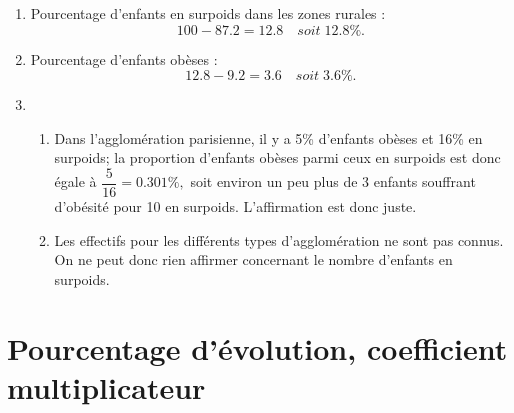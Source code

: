 \documentclass[xcolor={dvipsnames}]{beamer}
\begin{document}
\begin{frame}{}
\begin{enumerate}
	\item  Pourcentage d'enfants en surpoids dans les zones rurales :\pause
	\begin{equation*}
	\num{100} - \num{87.2} = \num{12.8} \quad soit \; \num{12.8} \%.
	\end{equation*}\pause
	
	 
	
	\item  Pourcentage d'enfants obèses :\pause
	\begin{equation*}
	\num{12.8} - \num{9.2} = \num{3.6} \quad soit \; \num{3.6} \%.
	\end{equation*}\pause
	
	\item \begin{enumerate}[a]
		\item Dans l'agglomération parisienne, il y a \num{5}\% d'enfants obèses et \num{16}\% en surpoids; la proportion d'enfants obèses parmi ceux en surpoids est donc égale à $\dfrac{5}{16}=\num{0.301} \%,$ soit environ un peu plus de 3 enfants souffrant d'obésité pour 10 en surpoids. L'affirmation est donc juste.\pause
		
		\item Les effectifs pour les différents types d'agglomération ne sont pas connus. On ne peut donc rien affirmer concernant le nombre d'enfants en surpoids.
	\end{enumerate}
	
	
\end{enumerate}
\end{frame}

\section{Pourcentage d'évolution, coefficient multiplicateur}



%
%
%	
\end{document}
